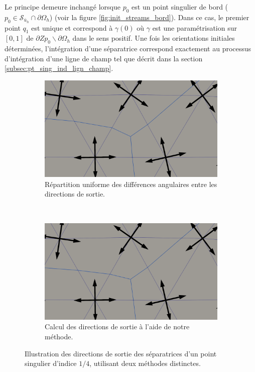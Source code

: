 Le principe demeure inchangé lorsque $p_0$ est un point singulier de bord ($p_0\in\mathcal{S}_{\bar{u}_h}\cap\partial\Omega_h$) (voir la figure \ref{fig:init_streams_bord}). Dans ce cas, le premier point $q_1$ est unique et correspond à $\gamma(0)$ où $\gamma$ est une paramétrisation sur $[0, 1]$ de $\partial Z{p_0}\backslash\partial\Omega_h$ dans le sens positif. Une fois les orientations initiales déterminées, l'intégration d'une séparatrice correspond exactement au processus d'intégration d'une ligne de champ tel que décrit dans la section \ref{subsec:pt_sing_ind_lign_champ}.

\begin{figure}[h!]
\centering
\begin{subfigure}[b]{0.7\textwidth}
    \centering
    \includegraphics[width=\textwidth]{images/depart_sepa_1.pdf}
    \caption{Répartition uniforme des différences angulaires entre les directions de sortie.}
\end{subfigure}
\\[0.5cm]
\begin{subfigure}[b]{0.7\textwidth}
    \centering
    \includegraphics[width=\textwidth]{images/depart_sepa_2.pdf}
    \caption{Calcul des directions de sortie à l'aide de notre méthode.}
\end{subfigure}
\caption{Illustration des directions de sortie des séparatrices d'un point singulier d'indice $1/4$, utilisant deux méthodes distinctes.}
\label{fig:first_dir}
\end{figure}

